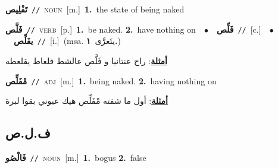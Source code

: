 \documentclass[10pt,a4paper,twoside]{article} %
\begin{document}
\begin{multicols}{2}
{\setlength\topsep{0pt}\textbf{\foreignlanguage{arabic}{تَفْلِيص}}\ {\color{gray}\texttt{//}\color{black}}\ \textsc{noun}\ [m.]\ \textbf{1.}~the state of being naked\ } \vspace{2mm}

{\setlength\topsep{0pt}\textbf{\foreignlanguage{arabic}{فَلَّص}}\ {\color{gray}\texttt{//}\color{black}}\ \textsc{verb}\ [p.]\ \textbf{1.}~be naked.  \textbf{2.}~have nothing on\ \ $\bullet$\ \ \setlength\topsep{0pt}\textbf{\foreignlanguage{arabic}{فَلِّص}}\ {\color{gray}\texttt{//}\color{black}}\ [c.]\ \ $\bullet$\ \ \setlength\topsep{0pt}\textbf{\foreignlanguage{arabic}{يفَلِّص}}\ {\color{gray}\texttt{//}\color{black}}\ [i.]\ \color{gray}(msa. \foreignlanguage{arabic}{يتَعرَّى}~\foreignlanguage{arabic}{\textbf{١.}})\color{black}\  \begin{flushright}\color{gray}\foreignlanguage{arabic}{\textbf{\underline{\foreignlanguage{arabic}{أمثلة}}}: راح عنتانيا و فَلَّص عالشط قلعاط يقلعطه}\end{flushright}\color{black}} \vspace{2mm}

{\setlength\topsep{0pt}\textbf{\foreignlanguage{arabic}{مْفَلِّص}}\ {\color{gray}\texttt{//}\color{black}}\ \textsc{adj}\ [m.]\ \textbf{1.}~being naked.  \textbf{2.}~having nothing on\  \begin{flushright}\color{gray}\foreignlanguage{arabic}{\textbf{\underline{\foreignlanguage{arabic}{أمثلة}}}: أول ما شفته مْفَلِّص هيك عيوني بقوا لبرة}\end{flushright}\color{black}} \vspace{2mm}

\vspace{-3mm}
\subsection*{\color{blue}\foreignlanguage{arabic}{ف.ل.ص}\color{blue}{ (ntws)}} 

{\setlength\topsep{0pt}\textbf{\foreignlanguage{arabic}{فَالْصُو}}\ {\color{gray}\texttt{//}\color{black}}\ \textsc{noun}\ [m.]\ \textbf{1.}~bogus  \textbf{2.}~false\ } \vspace{2mm}


\end{multicols}
\end{document}
